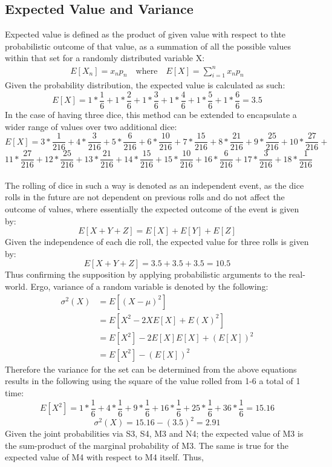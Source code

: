 \documentclass[12pt]{article}
\begin{document}
\subsection{Expected Value and Variance}
Expected value is defined as the product of given value with respect to thte probabilistic outcome of that value, as a summation of all the possible values  within that set for a randomly distributed variable X:
\begin{align*}
E[X_n]=x_np_n \quad \textrm{where} \quad E[X]=\sum_{i=1}^{n}x_np_n
\end{align*}
Given the probability distribution, the expected value is calculated as such:
$$E[X]=1*\frac{1}{6}+1*\frac{2}{6}+1*\frac{3}{6}+1*\frac{4}{6}+1*\frac{5}{6}+1*\frac{6}{6}=3.5$$
In the case of having three dice, this method can be extended to encapsulate a wider range of values over two additional dice:
$$E[X]=3*\frac{1}{216}+4*\frac{3}{216}+5*\frac{6}{216}+6*\frac{10}{216}+7*\frac{15}{216}+8*\frac{21}{216}+9*\frac{25}{216}+10*\frac{27}{216}+$$
$$11*\frac{27}{216}+12*\frac{25}{216}+13*\frac{21}{216}+14*\frac{15}{216}+15*\frac{10}{216}+16*\frac{6}{216}+17*\frac{3}{216}+18*\frac{1}{216}$$\\
The rolling of dice in such a way is denoted as an independent event, as the dice rolls in the future are not dependent on previous rolls and do not affect the outcome of values, where essentially the expected outcome of the event is given by:
$$E[X+Y+Z]=E[X]+E[Y]+E[Z]$$
Given the independence of each die roll, the expected value for three rolls is given by:
$$E[X+Y+Z]=3.5+3.5+3.5=10.5$$
Thus confirming the supposition by applying probabilistic arguments to the real-world. Ergo, variance of a random variable is denoted by the following:
\begin{align*}
\sigma^2(X)&=E[(X-\mu)^2]\\
&=E[X^2-2XE[X]+E(X)^2]\\
&=E[X^2]-2E[X]E[X]+(E[X])^2\\
&=E[X^2]-(E[X])^2
\end{align*}
Therefore the variance for the set can be determined from the above equations results in the following using the square of the value rolled from 1-6 a total of 1 time:
$$E[X^2]=1*\frac{1}{6}+4*\frac{1}{6}+9*\frac{1}{6}+16*\frac{1}{6}+25*\frac{1}{6}+36*\frac{1}{6}=15.16$$
$$\sigma^2(X)=15.16-(3.5)^2=2.91$$
Given the joint probabilities via S3, S4, M3 and N4; the expected value of M3 is the sum-product of the marginal probability of M3. The same is true for the expected value of M4 with respect to M4 itself. Thus,
\end{document}
